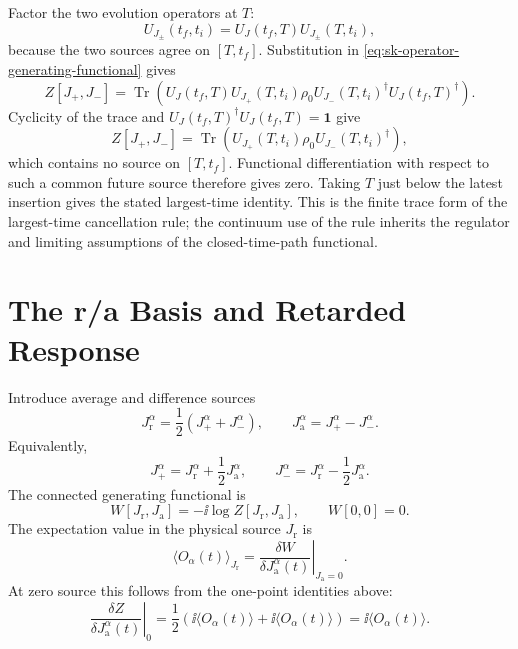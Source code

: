 Factor the two evolution operators at \(T\):
\[
  U_{J_\pm}(t_f,t_i)
  =
  U_J(t_f,T)U_{J_\pm}(T,t_i),
\]
because the two sources agree on \([T,t_f]\).  Substitution in
\eqref{eq:sk-operator-generating-functional} gives
\[
  Z[J_+,J_-]
  =
  \operatorname{Tr}\!\left(
    U_J(t_f,T)U_{J_+}(T,t_i)\rho_0
    U_{J_-}(T,t_i)^\dagger U_J(t_f,T)^\dagger
  \right).
\]
Cyclicity of the trace and \(U_J(t_f,T)^\dagger U_J(t_f,T)=\mathbf1\) give
\[
  Z[J_+,J_-]
  =
  \operatorname{Tr}\!\left(
    U_{J_+}(T,t_i)\rho_0U_{J_-}(T,t_i)^\dagger
  \right),
\]
which contains no source on \([T,t_f]\).  Functional differentiation with
respect to such a common future source therefore gives zero.  Taking \(T\)
just below the latest insertion gives the stated largest-time identity.
This is the finite trace form of the largest-time cancellation rule; the
continuum use of the rule inherits the regulator and limiting assumptions of
the closed-time-path functional.

\section{The r/a Basis and Retarded Response}

Introduce average and difference sources
\[
  J_{\mathrm r}^\alpha=\frac12(J_+^\alpha+J_-^\alpha),
  \qquad
  J_{\mathrm a}^\alpha=J_+^\alpha-J_-^\alpha .
\]
Equivalently,
\[
  J_+^\alpha=J_{\mathrm r}^\alpha+\frac12J_{\mathrm a}^\alpha,
  \qquad
  J_-^\alpha=J_{\mathrm r}^\alpha-\frac12J_{\mathrm a}^\alpha .
\]
The connected generating functional is
\[
  W[J_{\mathrm r},J_{\mathrm a}]
  =-\ii\log Z[J_{\mathrm r},J_{\mathrm a}],
  \qquad W[0,0]=0 .
\]
The expectation value in the physical source \(J_{\mathrm r}\) is
\begin{equation}
  \langle O_\alpha(t)\rangle_{J_{\mathrm r}}
  =
  \left.
  \frac{\delta W}{\delta J_{\mathrm a}^\alpha(t)}
  \right|_{J_{\mathrm a}=0}.
  \label{eq:sk-one-point-from-a-source}
\end{equation}
At zero source this follows from the one-point identities above:
\[
  \left.
  \frac{\delta Z}{\delta J_{\mathrm a}^\alpha(t)}
  \right|_0
  =
  \frac12\left(
  \ii\langle O_\alpha(t)\rangle+\ii\langle O_\alpha(t)\rangle
  \right)
  =
  \ii\langle O_\alpha(t)\rangle .
\]

